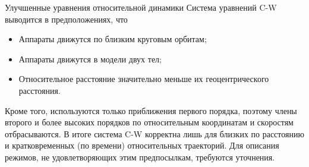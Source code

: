 \documentclass[8pt]{beamer}
\begin{document}
\begin{frame}{Улучшенные уравнения относительной динамики}
Система уравнений C-W выводится в предположениях, что 
\begin{itemize}
    \item Аппараты движутся по близким круговым орбитам;
    \item Аппараты движутся в модели двух тел;
    \item Относительное расстояние значительно меньше их геоцентрического расстояния.
\end{itemize}
Кроме того, используются только приближения первого порядка, поэтому члены второго и более высоких порядков по относительным координатам и скоростям отбрасываются. В итоге система C-W корректна лишь для близких по расстоянию и кратковременных (по времени) относительных траекторий. Для описания режимов, не удовлетворяющих этим предпосылкам, требуются уточнения.
\end{frame}
\end{document}
